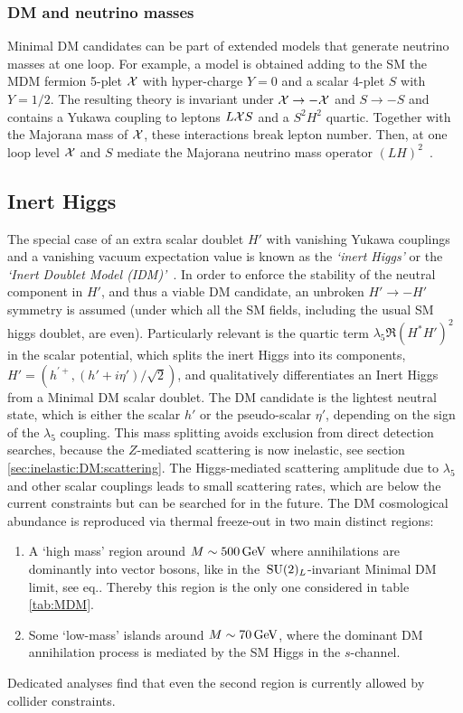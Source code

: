 \subsubsection{DM and neutrino masses}
Minimal DM candidates can be part of extended models that generate neutrino masses at one loop.
For example, a model is obtained adding to the SM the MDM fermion 5-plet  ${\cal X}$ with hyper-charge $Y=0$ and a
scalar 4-plet $S$ with  $Y=1/2$.
The resulting theory is invariant under ${\cal X}\to -{\cal X}$ and $S\to - S$
and contains a Yukawa coupling to leptons $L {\cal X} S$ and a $S^2 H^2$ quartic.
Together with the Majorana mass of ${\cal X}$, these interactions break lepton number.
Then, at one loop level ${\cal X}$ and $S$ mediate the Majorana neutrino mass operator $(LH)^2$~\cite{MDMnu}.



\subsection{Inert Higgs}\label{sec:inertHiggs}
The special case of an extra scalar doublet $H'$ with vanishing Yukawa couplings and a vanishing vacuum expectation value is known as  the {\em `inert Higgs'} or the {\em `Inert Doublet Model (IDM)'}~\cite{inertHiggs}.
In order to enforce the stability of the neutral component in $H'$, and thus a viable DM candidate, an unbroken $H'\to - H'$ symmetry is assumed (under which all the SM fields, including the usual SM higgs doublet, are even).
Particularly relevant is the quartic term $\lambda_5 \Re (H^* H')^2 $ in the scalar potential, which
splits the inert Higgs into its components,
$H'= (h^{\prime +}, (h' + i \eta')/\sqrt{2})$,
and qualitatively differentiates an Inert Higgs from a Minimal DM scalar doublet.
The DM candidate is the lightest neutral state, which is either the scalar $h'$ or the pseudo-scalar $\eta'$,
depending on the sign of the $\lambda_5$ coupling.
This mass splitting avoids exclusion from direct detection searches, because the $Z$-mediated scattering is now inelastic, see section \ref{sec:inelastic:DM:scattering}.
The Higgs-mediated scattering amplitude due to  $\lambda_5$ and other scalar couplings 
leads to small scattering rates, which are below the current constraints but can be searched for in the future. 
The DM cosmological abundance is reproduced via thermal freeze-out in two main distinct regions:
\begin{enumerate}
\item A `high mass' region around $M \sim 500\,{\rm GeV}$ where annihilations are dominantly into vector bosons,
like in the $\,{\rm SU}(2)_L$-invariant Minimal DM limit, see eq..
Thereby this region is the only one considered in table \ref{tab:MDM}.
\item Some `low-mass' islands around $M \sim70\,{\rm GeV}$, 
where the dominant DM annihilation process is mediated by the SM Higgs in the $s$-channel.
\end{enumerate}
Dedicated analyses find that even the second region is currently allowed by collider constraints.





